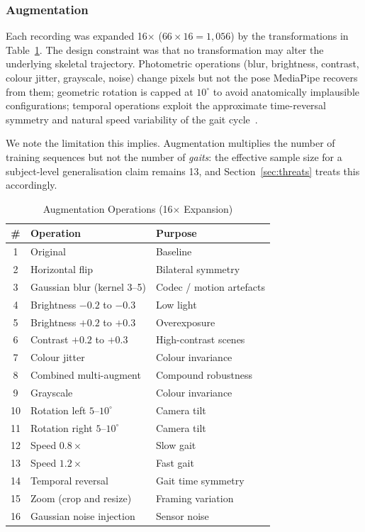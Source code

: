 \documentclass[journal]{IEEEtran}
\newcommand{\tabhead}[1]{\textbf{#1}}
\begin{document}
\subsubsection{Augmentation}
Each recording was expanded 16$\times$ ($66 \times 16 = 1{,}056$) by the
transformations in Table~\ref{tab:augmentation}. The design constraint was that
no transformation may alter the underlying skeletal trajectory. Photometric
operations (blur, brightness, contrast, colour jitter, grayscale, noise) change
pixels but not the pose MediaPipe recovers from them; geometric rotation is
capped at $10^{\circ}$ to avoid anatomically implausible configurations;
temporal operations exploit the approximate time-reversal symmetry and natural
speed variability of the gait cycle~\cite{shorten_survey,perry_gait}.

We note the limitation this implies. Augmentation multiplies the number of
training sequences but not the number of \emph{gaits}: the effective sample
size for a subject-level generalisation claim remains 13, and
Section~\ref{sec:threats} treats this accordingly.

\begin{table}[!t]
\caption{Augmentation Operations (16$\times$ Expansion)}
\label{tab:augmentation}
\centering
\small
\begin{tabular}{@{}clp{2.55cm}@{}}
\toprule
\tabhead{\#} & \tabhead{Operation} & \tabhead{Purpose} \\
\midrule
1  & Original                       & Baseline \\
2  & Horizontal flip                & Bilateral symmetry \\
3  & Gaussian blur (kernel 3--5)    & Codec / motion artefacts \\
4  & Brightness $-0.2$ to $-0.3$    & Low light \\
5  & Brightness $+0.2$ to $+0.3$    & Overexposure \\
6  & Contrast $+0.2$ to $+0.3$      & High-contrast scenes \\
7  & Colour jitter                  & Colour invariance \\
8  & Combined multi-augment         & Compound robustness \\
9  & Grayscale                      & Colour invariance \\
10 & Rotation left $5$--$10^{\circ}$  & Camera tilt \\
11 & Rotation right $5$--$10^{\circ}$ & Camera tilt \\
12 & Speed $0.8\times$              & Slow gait \\
13 & Speed $1.2\times$              & Fast gait \\
14 & Temporal reversal              & Gait time symmetry \\
15 & Zoom (crop and resize)         & Framing variation \\
16 & Gaussian noise injection       & Sensor noise \\
\bottomrule
\end{tabular}
\end{table}
\end{document}
